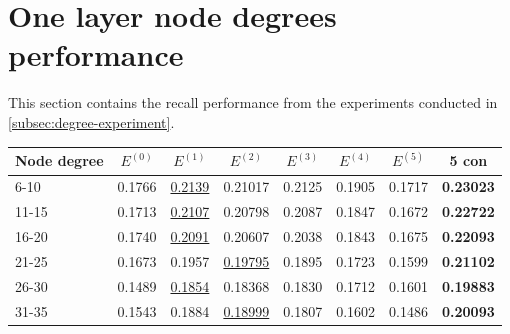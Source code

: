 \section{One layer node degrees performance}\label{app:degree-experiment}\label{app:individual-recall-degree-experiment}
This section contains the recall performance from the experiments conducted in \autoref{subsec:degree-experiment}.
\begin{table}[h!]
    \centering
    \begin{tabular}{|l|l|l|l|l|l|l||l|}
        \hline
        Node degree & \multicolumn{1}{c|}{$E^{(0)}$} & \multicolumn{1}{c|}{$E^{(1)}$} & \multicolumn{1}{c|}{$E^{(2)}$} & \multicolumn{1}{c|}{$E^{(3)}$} & \multicolumn{1}{c|}{$E^{(4)}$} & \multicolumn{1}{c||}{$E^{(5)}$} & \multicolumn{1}{c|}{5 con} \\ \hline
        6-10        & 0.1766                         & \underline{0.2139}             & 0.21017                        & 0.2125                         & 0.1905                         & 0.1717                          & \textbf{0.23023}           \\ \hline
        11-15       & 0.1713                         & \underline{0.2107}             & 0.20798                        & 0.2087                         & 0.1847                         & 0.1672                          & \textbf{0.22722}           \\ \hline
        16-20       & 0.1740                         & \underline{0.2091}             & 0.20607                        & 0.2038                         & 0.1843                         & 0.1675                          & \textbf{0.22093}           \\ \hline
        21-25       & 0.1673                         & 0.1957                         & \underline{0.19795}            & 0.1895                         & 0.1723                         & 0.1599                          & \textbf{0.21102}           \\ \hline
        26-30       & 0.1489                         & \underline{0.1854}             & 0.18368                        & 0.1830                         & 0.1712                         & 0.1601                          & \textbf{0.19883}           \\ \hline
        31-35       & 0.1543                         & 0.1884                         & \underline{0.18999}            & 0.1807                         & 0.1602                         & 0.1486                          & \textbf{0.20093}           \\ \hline

\end{tabular}
\end{table}
